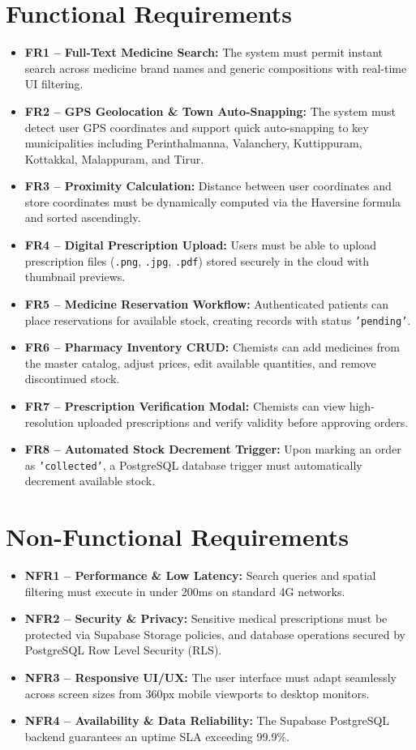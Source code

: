 \documentclass[12pt,a4paper]{report}
\begin{document}
\section{Functional Requirements}
\begin{itemize}
    \item \textbf{FR1 -- Full-Text Medicine Search:} The system must permit instant search across medicine brand names and generic compositions with real-time UI filtering.
    \item \textbf{FR2 -- GPS Geolocation \& Town Auto-Snapping:} The system must detect user GPS coordinates and support quick auto-snapping to key municipalities including Perinthalmanna, Valanchery, Kuttippuram, Kottakkal, Malappuram, and Tirur.
    \item \textbf{FR3 -- Proximity Calculation:} Distance between user coordinates and store coordinates must be dynamically computed via the Haversine formula and sorted ascendingly.
    \item \textbf{FR4 -- Digital Prescription Upload:} Users must be able to upload prescription files (\texttt{.png}, \texttt{.jpg}, \texttt{.pdf}) stored securely in the cloud with thumbnail previews.
    \item \textbf{FR5 -- Medicine Reservation Workflow:} Authenticated patients can place reservations for available stock, creating records with status \texttt{'pending'}.
    \item \textbf{FR6 -- Pharmacy Inventory CRUD:} Chemists can add medicines from the master catalog, adjust prices, edit available quantities, and remove discontinued stock.
    \item \textbf{FR7 -- Prescription Verification Modal:} Chemists can view high-resolution uploaded prescriptions and verify validity before approving orders.
    \item \textbf{FR8 -- Automated Stock Decrement Trigger:} Upon marking an order as \texttt{'collected'}, a PostgreSQL database trigger must automatically decrement available stock.
\end{itemize}

\section{Non-Functional Requirements}
\begin{itemize}
    \item \textbf{NFR1 -- Performance \& Low Latency:} Search queries and spatial filtering must execute in under 200ms on standard 4G networks.
    \item \textbf{NFR2 -- Security \& Privacy:} Sensitive medical prescriptions must be protected via Supabase Storage policies, and database operations secured by PostgreSQL Row Level Security (RLS).
    \item \textbf{NFR3 -- Responsive UI/UX:} The user interface must adapt seamlessly across screen sizes from 360px mobile viewports to desktop monitors.
    \item \textbf{NFR4 -- Availability \& Data Reliability:} The Supabase PostgreSQL backend guarantees an uptime SLA exceeding 99.9\%.
\end{itemize}
\end{document}
